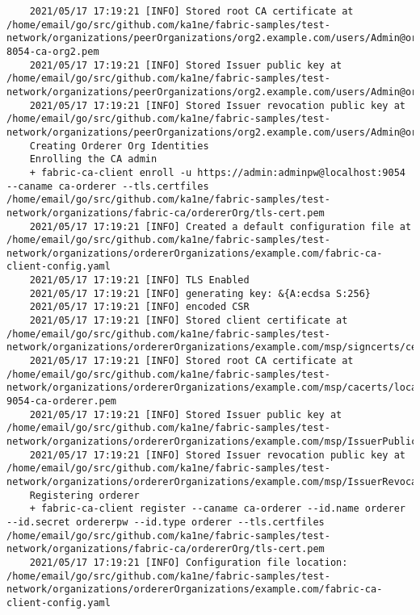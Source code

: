 \begin{lstlisting}
    2021/05/17 17:19:21 [INFO] Stored root CA certificate at /home/email/go/src/github.com/ka1ne/fabric-samples/test-network/organizations/peerOrganizations/org2.example.com/users/Admin@org2.example.com/msp/cacerts/localhost-8054-ca-org2.pem
    2021/05/17 17:19:21 [INFO] Stored Issuer public key at /home/email/go/src/github.com/ka1ne/fabric-samples/test-network/organizations/peerOrganizations/org2.example.com/users/Admin@org2.example.com/msp/IssuerPublicKey
    2021/05/17 17:19:21 [INFO] Stored Issuer revocation public key at /home/email/go/src/github.com/ka1ne/fabric-samples/test-network/organizations/peerOrganizations/org2.example.com/users/Admin@org2.example.com/msp/IssuerRevocationPublicKey
    Creating Orderer Org Identities
    Enrolling the CA admin
    + fabric-ca-client enroll -u https://admin:adminpw@localhost:9054 --caname ca-orderer --tls.certfiles /home/email/go/src/github.com/ka1ne/fabric-samples/test-network/organizations/fabric-ca/ordererOrg/tls-cert.pem
    2021/05/17 17:19:21 [INFO] Created a default configuration file at /home/email/go/src/github.com/ka1ne/fabric-samples/test-network/organizations/ordererOrganizations/example.com/fabric-ca-client-config.yaml
    2021/05/17 17:19:21 [INFO] TLS Enabled
    2021/05/17 17:19:21 [INFO] generating key: &{A:ecdsa S:256}
    2021/05/17 17:19:21 [INFO] encoded CSR
    2021/05/17 17:19:21 [INFO] Stored client certificate at /home/email/go/src/github.com/ka1ne/fabric-samples/test-network/organizations/ordererOrganizations/example.com/msp/signcerts/cert.pem
    2021/05/17 17:19:21 [INFO] Stored root CA certificate at /home/email/go/src/github.com/ka1ne/fabric-samples/test-network/organizations/ordererOrganizations/example.com/msp/cacerts/localhost-9054-ca-orderer.pem
    2021/05/17 17:19:21 [INFO] Stored Issuer public key at /home/email/go/src/github.com/ka1ne/fabric-samples/test-network/organizations/ordererOrganizations/example.com/msp/IssuerPublicKey
    2021/05/17 17:19:21 [INFO] Stored Issuer revocation public key at /home/email/go/src/github.com/ka1ne/fabric-samples/test-network/organizations/ordererOrganizations/example.com/msp/IssuerRevocationPublicKey
    Registering orderer
    + fabric-ca-client register --caname ca-orderer --id.name orderer --id.secret ordererpw --id.type orderer --tls.certfiles /home/email/go/src/github.com/ka1ne/fabric-samples/test-network/organizations/fabric-ca/ordererOrg/tls-cert.pem
    2021/05/17 17:19:21 [INFO] Configuration file location: /home/email/go/src/github.com/ka1ne/fabric-samples/test-network/organizations/ordererOrganizations/example.com/fabric-ca-client-config.yaml

\end{lstlisting}

